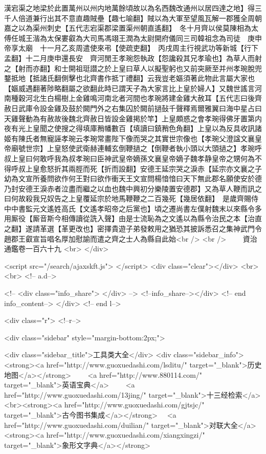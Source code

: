 漢宕渠之地梁於此置萬州以州内地萬餘頃故以為名西魏改通州以居四達之地】得三千人倍道兼行出其不意直趣賊壘【趣七喻翻】賊以為大軍至望風瓦解一郡獲全周朝嘉之以為渠州刺史【五代志宕渠郡梁置渠州朝直遙翻】　冬十月齊以侯莫陳相為太傅任城王湝為太保婁叡為大司馬馮翊王潤為太尉開府儀同三司韓祖念為司徒　庚申帝享太廟　十一月乙亥周遣使來弔【使疏吏翻】　丙戌周主行視武功等新城【行下孟翻】十二月庚申還長安　齊河閒王孝琬怨執政【怨讒殺其兄孝瑜也】為草人而射之【射而亦翻】和士開祖珽譛之於上皇曰草人以擬聖躬也又前突厥至并州孝琬脫兜鍪抵地【抵諸氏翻側擊也北齊書作抵丁禮翻】云我豈老嫗須著此物此言屬大家也【嫗威遇翻著陟略翻屬之欲翻此時已謂天子為大家言比上皇於婦人】又魏世謠言河南種穀河北生白楊樹上金雞鳴河南北者河間也孝琬將建金雞大赦耳【五代志曰後齊赦日武庫令設金雞及鼓於闕門外之右集囚於闕前撾鼔千聲釋焉爾雅翼曰海中星占曰天雞聲動為有赦故後魏北齊赦日皆設金雞掲於竿】上皇頗惑之會孝琬得佛牙置第内夜有光上皇聞之使搜之得填庫矟幡數百【填讀曰鎮矟色角翻】上皇以為反具收訊諸姬有陳氏者無寵誣孝琬云孝琬常畫陛下像而哭之其實世宗像也【孝琬父澄諡文襄皇帝廟號世宗】上皇怒使武衛赫連輔玄倒鞭撾之【倒鞭者執小頭以大頭撾之】孝琬呼叔上皇曰何敢呼我為叔孝琬曰臣神武皇帝嫡孫文襄皇帝嫡子魏孝静皇帝之甥何為不得呼叔上皇愈怒折其兩脛而死【折而設翻】安德王延宗哭之淚赤【延宗亦文襄之子幼為文宣所養問欲作何王對曰欲作衝天王文宣問楊愔愔曰天下無此郡名願使安於德乃封安德王淚赤者泣盡而繼之以血也魏中興初分樂陵置安德郡】又為草人鞭而訊之曰何故殺我兄奴告之上皇覆延宗於地馬鞭鞭之二百幾死【幾居依翻】　是歲齊賜侍中中書監元文遙姓高氏【文遙孝昭帝之后黨也】頃之遷尚書左僕射魏末以來縣令多用厮役【厮音斯今相傳讀從詵入聲】由是士流恥為之文遙以為縣令治民之本【治直之翻】遂請革選【革更改也】密擇貴遊子弟發敕用之猶恐其披訴悉召之集神武門令趙郡王叡宣旨唱名厚加慰諭而遣之齊之士人為縣自此始<br />
<br />
　　資治通鑑卷一百六十九  <br>
   </div> 

<script src="/search/ajaxskft.js"> </script>
 <div class="clear"></div>
<br>
<br>
 <!-- a.d-->

 <!--
<div class="info_share">
</div> 
-->
 <!--info_share--></div>   <!-- end info_content-->
  </div> <!-- end l-->

<div class="r">   <!--r-->



<div class="sidebar"  style="margin-bottom:2px;">

 
<div class="sidebar_title">工具类大全</div>
<div class="sidebar_info">
<strong><a href="http://www.guoxuedashi.com/lsditu/" target="_blank">历史地图</a></strong>　　
<a href="http://www.880114.com/" target="_blank">英语宝典</a>　　
<a href="http://www.guoxuedashi.com/13jing/" target="_blank">十三经检索</a>　
<br><strong><a href="http://www.guoxuedashi.com/gjtsjc/" target="_blank">古今图书集成</a></strong>　
<a href="http://www.guoxuedashi.com/duilian/" target="_blank">对联大全</a>　<strong><a href="http://www.guoxuedashi.com/xiangxingzi/" target="_blank">象形文字典</a></strong>　

